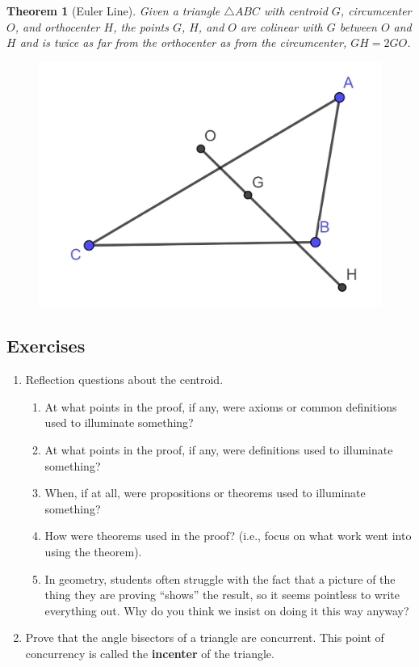 \documentclass[
]{book}
\providecommand{\tightlist}{%
  \setlength{\itemsep}{0pt}\setlength{\parskip}{0pt}}
\newtheorem{theorem}{Theorem}[chapter]
\theoremstyle{definition}
\theoremstyle{definition}
\theoremstyle{definition}
\theoremstyle{definition}
\theoremstyle{remark}
\begin{document}
\begin{theorem}[Euler Line]
Given a triangle \(\triangle ABC\) with centroid \(G\), circumcenter \(O\), and orthocenter \(H\), the points \(G\), \(H\), and \(O\) are colinear with \(G\) between \(O\) and \(H\) and is twice as far from the orthocenter as from the circumcenter, \(GH=2GO\).
\end{theorem}

\begin{figure}

{\centering \includegraphics[width=0.3\linewidth]{images/EulerLine} 

}

\end{figure}

\hypertarget{exercises-42}{%
\subsection{Exercises}\label{exercises-42}}

\begin{enumerate}
\def\labelenumi{\arabic{enumi}.}
\item
  Reflection questions about the centroid.

  \begin{enumerate}
  \def\labelenumii{\alph{enumii}.}
  \tightlist
  \item
    At what points in the proof, if any, were axioms or common definitions used to illuminate something?
  \item
    At what points in the proof, if any, were definitions used to illuminate something?
  \item
    When, if at all, were propositions or theorems used to illuminate something?
  \item
    How were theorems used in the proof? (i.e., focus on what work went into using the theorem).
  \item
    In geometry, students often struggle with the fact that a picture of the thing they are proving ``shows'' the result, so it seems pointless to write everything out. Why do you think we insist on doing it this way anyway?
  \end{enumerate}
\item
  Prove that the angle bisectors of a triangle are concurrent. This point of concurrency is called the \textbf{incenter} of the triangle.
\end{enumerate}
\end{document}
